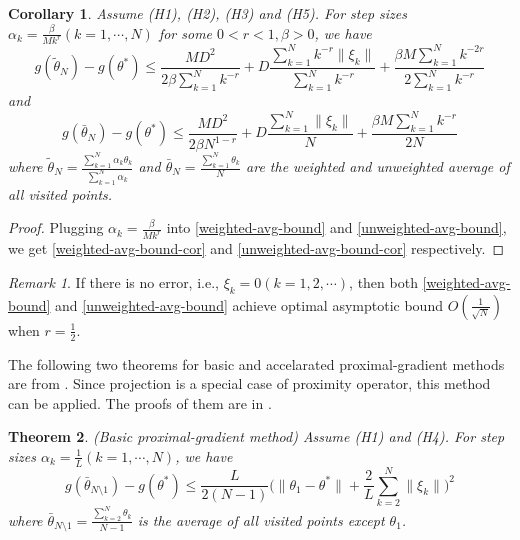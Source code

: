 \documentclass[psamsfonts]{article}
\newtheorem{thm}{Theorem} %
\newtheorem{cor}[thm]{Corollary}
\theoremstyle{definition}
\theoremstyle{remark}
\newtheorem*{rem}{Remark}
\numberwithin{equation} {section}
\begin{document}
\begin{cor}
Assume (H1), (H2), (H3) and (H5). For step sizes $\alpha_k = \frac{\beta}{Mk^r}(k = 1, \cdots, N)$ for some $0 < r < 1, \beta > 0$, we have
\begin{equation}\label{weighted-avg-bound-cor}
g(\tilde{\theta}_N) - g(\theta^*) \le \frac{MD^2}{2\beta \sum_{k = 1}^N k^{-r}} + D\frac{\sum_{k=1}^{N}k^{-r} \| \xi_k \|}{\sum_{k=1}^{N}k^{-r}} + \frac{\beta M \sum_{k = 1}^N k^{-2r}}{2\sum_{k = 1}^N k^{-r}}
\end{equation}
and
\begin{equation}\label{unweighted-avg-bound-cor}
g(\bar{\theta}_N) - g(\theta^*) \le \frac{MD^2}{2\beta N^{1-r}} + D\frac{\sum_{k=1}^{N} \| \xi_k \|}{N} + \frac{\beta M \sum_{k = 1}^N k^{-r}}{2N}
\end{equation}
where $\tilde{\theta}_N = \frac{\sum_{k = 1}^N \alpha_k \theta_k}{\sum_{k = 1}^N \alpha_k}$ and $\bar{\theta}_N = \frac{\sum_{k = 1}^N \theta_k}{N}$ are the weighted and unweighted average of all visited points.
\end{cor}

\begin{proof}
Plugging $\alpha_k = \frac{\beta}{Mk^r}$ into \eqref{weighted-avg-bound} and \eqref{unweighted-avg-bound}, we get \eqref{weighted-avg-bound-cor} and \eqref{unweighted-avg-bound-cor} respectively.
\end{proof}


\begin{rem}
If there is no error, i.e., $\xi_k=0(k=1,2,\cdots)$, then both \eqref{weighted-avg-bound} and \eqref{unweighted-avg-bound} achieve optimal asymptotic bound $O(\frac{1}{\sqrt{N}})$ when $r=\frac{1}{2}$.
\end{rem}

The following two theorems for basic and accelarated proximal-gradient methods are from \cite{prox}. Since projection is a special case of proximity operator, this method can be applied. The proofs of them are in \cite{prox}.

\begin{thm}(Basic proximal-gradient method)
Assume (H1) and (H4). For step sizes $\alpha_k = \frac{1}{L}(k = 1, \cdots, N)$, we have
\begin{equation}\label{basic-prox-bound}
g(\bar{\theta}_{N\setminus 1}) - g(\theta^*) \le \frac{L}{2(N-1)}\big(\|\theta_1 - \theta^* \| + \frac{2}{L} \sum_{k=2}^{N} \|\xi_k\|\big)^2
\end{equation}
where $\bar{\theta}_{N\setminus 1} = \frac{\sum_{k=2}^N \theta_k}{N-1}$ is the average of all visited points except $\theta_1$.
\end{thm}
\end{document}
